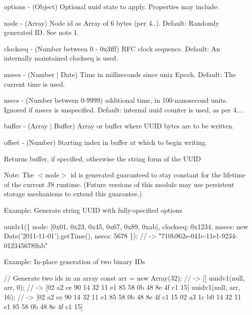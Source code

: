 \begin{DoxyItemize}
\item {\ttfamily options} -\/ (Object) Optional uuid state to apply. Properties may include\+:
\begin{DoxyItemize}
\item {\ttfamily node} -\/ (Array) Node id as Array of 6 bytes (per 4..). Default\+: Randomly generated ID. See note 1.
\item {\ttfamily clockseq} -\/ (Number between 0 -\/ 0x3fff) R\+FC clock sequence. Default\+: An internally maintained clockseq is used.
\item {\ttfamily msecs} -\/ (Number $\vert$ Date) Time in milliseconds since unix Epoch. Default\+: The current time is used.
\item {\ttfamily nsecs} -\/ (Number between 0-\/9999) additional time, in 100-\/nanosecond units. Ignored if {\ttfamily msecs} is unspecified. Default\+: internal uuid counter is used, as per 4....
\end{DoxyItemize}
\item {\ttfamily buffer} -\/ (Array $\vert$ Buffer) Array or buffer where U\+U\+ID bytes are to be written.
\item {\ttfamily offset} -\/ (Number) Starting index in {\ttfamily buffer} at which to begin writing.
\end{DoxyItemize}

Returns {\ttfamily buffer}, if specified, otherwise the string form of the U\+U\+ID

Note\+: The $<$node$>$ id is generated guaranteed to stay constant for the lifetime of the current JS runtime. (Future versions of this module may use persistent storage mechanisms to extend this guarantee.)

Example\+: Generate string U\+U\+ID with fully-\/specified options


\begin{DoxyCode}
uuidv1(\{
  node: [0x01, 0x23, 0x45, 0x67, 0x89, 0xab],
  clockseq: 0x1234,
  msecs: new Date('2011-11-01').getTime(),
  nsecs: 5678
\});   // -> "710b962e-041c-11e1-9234-0123456789ab"
\end{DoxyCode}


Example\+: In-\/place generation of two binary I\+Ds


\begin{DoxyCode}
// Generate two ids in an array
const arr = new Array(32); // -> []
uuidv1(null, arr, 0);   // -> [02 a2 ce 90 14 32 11 e1 85 58 0b 48 8e 4f c1 15]
uuidv1(null, arr, 16);  // -> [02 a2 ce 90 14 32 11 e1 85 58 0b 48 8e 4f c1 15 02 a3 1c b0 14 32 11 e1 85
       58 0b 48 8e 4f c1 15]
\end{DoxyCode}


